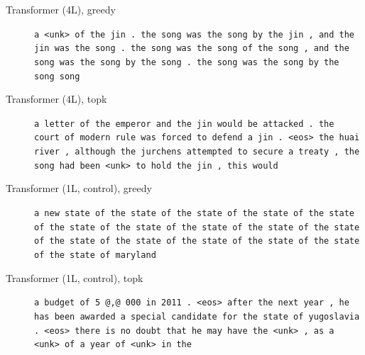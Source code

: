 \begin{description}
\item[Transformer (4L), greedy] \texttt{\small a \textless{}unk\textgreater{} of the jin . the song was the song by the jin , and the jin was the song . the song was the song of the song , and the song was the song by the song . the song was the song by the song song}
\item[Transformer (4L), topk] \texttt{\small a letter of the emperor and the jin would be attacked . the court of modern rule was forced to defend a jin . \textless{}eos\textgreater{} the huai river , although the jurchens attempted to secure a treaty , the song had been \textless{}unk\textgreater{} to hold the jin , this would}
\item[Transformer (1L, control), greedy] \texttt{\small a new state of the state of the state of the state of the state of the state of the state of the state of the state of the state of the state of the state of the state of the state of the state of the state of maryland}
\item[Transformer (1L, control), topk] \texttt{\small a budget of 5 @,@ 000 in 2011 . \textless{}eos\textgreater{} after the next year , he has been awarded a special candidate for the state of yugoslavia . \textless{}eos\textgreater{} there is no doubt that he may have the \textless{}unk\textgreater{} , as a \textless{}unk\textgreater{} of a year of \textless{}unk\textgreater{} in the}
\end{description}
